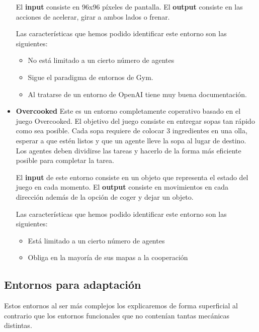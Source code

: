 \begin{itemize}
	      El \textbf{input} consiste en 96x96 píxeles de pantalla. El \textbf{output} consiste en las acciones de acelerar, girar a ambos lados o frenar.

	      Las características que hemos podido identificar este entorno son las siguientes:
	      \begin{itemize}
		      \item No está limitado a un cierto número de agentes
		      \item Sigue el paradigma de entornos de Gym.
		      \item Al tratarse de un entorno de OpenAI tiene muy buena documentación.
	      \end{itemize}
            
    \item \textbf{Overcooked} \cite {overcooked} Este es un entorno completamente coperativo basado en el juego Overcooked. El objetivo del juego consiste en entregar sopas tan rápido como sea posible. Cada sopa requiere de colocar 3 ingredientes en una olla, esperar a que estén listos y que un agente lleve la sopa al lugar de destino. Los agentes deben dividirse las tareas y hacerlo de la forma más eficiente posible para completar la tarea.
    
    El \textbf{input} de este entorno consiste en un objeto que representa el estado del juego en cada momento. El \textbf{output} consiste en movimientos en cada dirección además de la opción de coger y dejar un objeto.

    Las características que hemos podido identificar este entorno son las siguientes:
	      \begin{itemize}
		      \item Está limitado a un cierto número de agentes
		      \item Obliga en la mayoría de sus mapas a la cooperación
	      \end{itemize}

\end{itemize}

\subsection{Entornos para adaptación}

Estos entornos al ser más complejos los explicaremos de forma superficial al contrario que los entornos funcionales que no contenían tantas mecánicas distintas.

